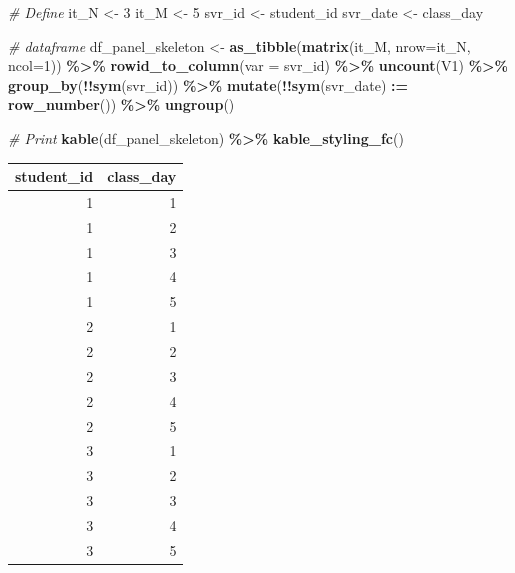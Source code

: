 \documentclass[
]{book}
\newenvironment{Shaded}{\begin{snugshade}}{\end{snugshade}}
\newcommand{\CommentTok}[1]{\textcolor[rgb]{0.56,0.35,0.01}{\textit{#1}}}
\newcommand{\DataTypeTok}[1]{\textcolor[rgb]{0.13,0.29,0.53}{#1}}
\newcommand{\DecValTok}[1]{\textcolor[rgb]{0.00,0.00,0.81}{#1}}
\newcommand{\ErrorTok}[1]{\textcolor[rgb]{0.64,0.00,0.00}{\textbf{#1}}}
\newcommand{\KeywordTok}[1]{\textcolor[rgb]{0.13,0.29,0.53}{\textbf{#1}}}
\newcommand{\NormalTok}[1]{#1}
\newcommand{\OperatorTok}[1]{\textcolor[rgb]{0.81,0.36,0.00}{\textbf{#1}}}
\newcommand{\StringTok}[1]{\textcolor[rgb]{0.31,0.60,0.02}{#1}}
\begin{document}
\begin{Shaded}
\begin{Highlighting}[]
\CommentTok{\# Define}
\NormalTok{it\_N \textless{}{-}}\StringTok{ }\DecValTok{3}
\NormalTok{it\_M \textless{}{-}}\StringTok{ }\DecValTok{5}
\NormalTok{svr\_id \textless{}{-}}\StringTok{ \textquotesingle{}student\_id\textquotesingle{}}
\NormalTok{svr\_date \textless{}{-}}\StringTok{ \textquotesingle{}class\_day\textquotesingle{}}

\CommentTok{\# dataframe}
\NormalTok{df\_panel\_skeleton \textless{}{-}}\StringTok{ }\KeywordTok{as\_tibble}\NormalTok{(}\KeywordTok{matrix}\NormalTok{(it\_M, }\DataTypeTok{nrow=}\NormalTok{it\_N, }\DataTypeTok{ncol=}\DecValTok{1}\NormalTok{)) }\OperatorTok{\%\textgreater{}\%}
\StringTok{  }\KeywordTok{rowid\_to\_column}\NormalTok{(}\DataTypeTok{var =}\NormalTok{ svr\_id) }\OperatorTok{\%\textgreater{}\%}
\StringTok{  }\KeywordTok{uncount}\NormalTok{(V1) }\OperatorTok{\%\textgreater{}\%}
\StringTok{  }\KeywordTok{group\_by}\NormalTok{(}\OperatorTok{!!}\KeywordTok{sym}\NormalTok{(svr\_id)) }\OperatorTok{\%\textgreater{}\%}\StringTok{ }\KeywordTok{mutate}\NormalTok{(}\OperatorTok{!!}\KeywordTok{sym}\NormalTok{(svr\_date) }\OperatorTok{:}\ErrorTok{=}\StringTok{ }\KeywordTok{row\_number}\NormalTok{()) }\OperatorTok{\%\textgreater{}\%}
\StringTok{  }\KeywordTok{ungroup}\NormalTok{()}

\CommentTok{\# Print}
\KeywordTok{kable}\NormalTok{(df\_panel\_skeleton) }\OperatorTok{\%\textgreater{}\%}
\StringTok{  }\KeywordTok{kable\_styling\_fc}\NormalTok{()}
\end{Highlighting}
\end{Shaded}

\begin{table}[!h]
\centering
\begin{tabular}{r|r}
\hline
student\_id & class\_day\\
\hline
\rowcolor{gray!6}  1 & 1\\
\hline
1 & 2\\
\hline
\rowcolor{gray!6}  1 & 3\\
\hline
1 & 4\\
\hline
\rowcolor{gray!6}  1 & 5\\
\hline
2 & 1\\
\hline
\rowcolor{gray!6}  2 & 2\\
\hline
2 & 3\\
\hline
\rowcolor{gray!6}  2 & 4\\
\hline
2 & 5\\
\hline
\rowcolor{gray!6}  3 & 1\\
\hline
3 & 2\\
\hline
\rowcolor{gray!6}  3 & 3\\
\hline
3 & 4\\
\hline
\rowcolor{gray!6}  3 & 5\\
\hline
\end{tabular}
\end{table}
\end{document}
